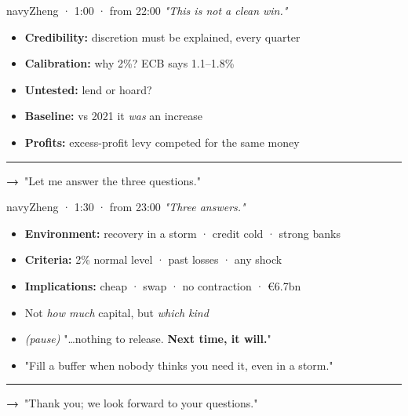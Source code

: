 \documentclass[10pt]{article}
\begin{document}
\begin{card}{navy}{\hfill{\normalsize\mdseries Zheng · 1:00 · from 22:00}}
{\large\itshape "This is not a clean win."}\par\smallskip
\begin{itemize}[label=\textcolor{navy}{\textbullet}]\item \textbf{Credibility:} discretion must be explained, every quarter\item \textbf{Calibration:} why 2\%? ECB says 1.1–1.8\%\item \textbf{Untested:} lend or hoard?\item \textbf{Baseline:} vs 2021 it \emph{was} an increase\item \textbf{Profits:} excess-profit levy competed for the same money\end{itemize}
\vfill\textcolor{grey}{\rule{\linewidth}{0.3pt}}\par{\bfseries\color{navy}→}\ "Let me answer the three questions."
\end{card}
\hfill
\begin{card}{navy}{\hfill{\normalsize\mdseries Zheng · 1:30 · from 23:00}}
{\large\itshape "Three answers."}\par\smallskip
\begin{itemize}[label=\textcolor{navy}{\textbullet}]\item \textbf{Environment:} recovery in a storm · credit cold · strong banks\item \textbf{Criteria:} 2\% normal level · past losses · any shock\item \textbf{Implications:} cheap · swap · no contraction · €6.7bn\item Not \emph{how much} capital, but \emph{which kind}\item \emph{(pause)} "…nothing to release. \textbf{Next time, it will.}"\item "Fill a buffer when nobody thinks you need it, even in a storm."\end{itemize}
\vfill\textcolor{grey}{\rule{\linewidth}{0.3pt}}\par{\bfseries\color{navy}→}\ "Thank you; we look forward to your questions."
\end{card}


\vspace{0.35cm}
\end{document}
